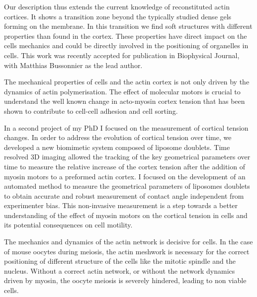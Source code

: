 \documentclass[A4paperpaper,11pt,english]{sphinxmanual}
\begin{document}
Our  description  thus extends  the  current  knowledge of  reconstituted
actin cortices. It  shows a transition  zone beyond  the typically studied
dense gels forming  on the  membrane.  In  this transition  we  find  soft
structures  with different  properties than  found in  the cortex.  These
properties  have direct impact on the cells mechanics and  could be directly
involved in the positioning of  organelles in  cells. This  work was  recently
accepted  for publication  in Biophysical Journal, with Matthias Bussonnier as
the lead author.

The mechanical properties  of cells and the  actin cortex is not  only driven
by the dynamics of actin polymerisation. The  effect of molecular motors is
crucial to understand the well known change  in acto-myosin cortex tension that
has been shown to contribute to cell-cell adhesion and cell sorting.

In a  second project of  my PhD  I focused  on the measurement  of
cortical tension changes.  In order  to address  the evolution  of cortical
tension over time, we developed  a new biomimetic system composed of  liposome
doublets. Time resolved 3D imaging  allowed the tracking of the key geometrical
parameters over time to measure  the relative increase of the cortex tension
after the addition of myosin motors to a preformed actin cortex. I focused on
the development of an automated method to measure the  geometrical parameters
of liposomes doublets to obtain  accurate  and  robust  measurement of  contact
angle  independent  from experimenter  bias. This  non-invasive measurement  is
a  step towards  a better understanding of  the effect of myosin  motors on the
cortical  tension in cells and its potential consequences on cell motility.

The mechanics and  dynamics of the actin  network is decisive for  cells. In
the case of  mouse oocytes during meiosis,  the actin meshwork is  necessary
for the correct positioning of different structure of the cells like the
mitotic spindle and  the nucleus.  Without  a  correct actin  network,  or
without the  network dynamics driven by  myosin, the oocyte meiosis is severely
hindered, leading to non viable cells.
\end{document}
